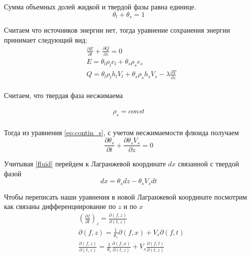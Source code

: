 \documentclass[12pt,a4paper]{article}
\newcommand{\pd}[2]{\frac{\partial #1}{\partial #2}}
\begin{document}
Сумма объемных долей жидкой и твердой фазы равна единице.
\begin{equation}
\theta_l + \theta_s = 1
\label{eq:satur}
\end{equation}

Считаем что источников энергии нет, тогда уравнение сохранения энергии принимает следующий вид:
\begin{equation}
\begin{aligned}
&\pd{E}{t} + \pd{Q}{z} =0 \\
&E=\theta_l\rho_l e_l + \theta_s\rho_s e_s \\
&Q=\theta_l\rho_l h_l V_l + \theta_s\rho_s h_s V_s - \lambda \pd{T}{z}\\
\label{eq:conserv}
\end{aligned}
\end{equation}

Считаем, что твердая фаза несжимаема

\begin{equation}
\begin{aligned}
\rho_s = const \\
\label{rho_const}
\end{aligned}
\end{equation}

Тогда из уравнения \eqref{eq:contin_s}, с учетом несжимаемости флюида получаем
\begin{equation}
\pd{\theta_s}{t} + \pd{\theta_s V_s}{z} = 0
\label{fluid}
\end{equation}

Учитывая \eqref{fluid} перейдем к Лагранжевой координате $dx$ связанной с твердой фазой
\begin{equation}
dx = \theta_s dz - \theta_s V_s dt
\label{dx_dz}
\end{equation}

Чтобы переписать наши уравнения в новой Лагранжевой координате посмотрим как связаны дифференциирование по $ z $ и по $ x $
\begin{equation}
\begin{aligned}
&\left(\pd{f}{t}\right)_z = \pd{(f , z)}{(t , z)}\\
&\partial(f , z) = \frac{1}{\theta_s}\partial(f , x) + V_s \partial(f , t)\\
&\pd{(f , z)}{(t , z)} = \frac{1}{\theta_s}\pd{(f , x)}{(t , z)} + V_s\pd{(f , t)}{(t , z)}\\
\end{aligned}
\label{help1}
\end{equation}
\end{document}
